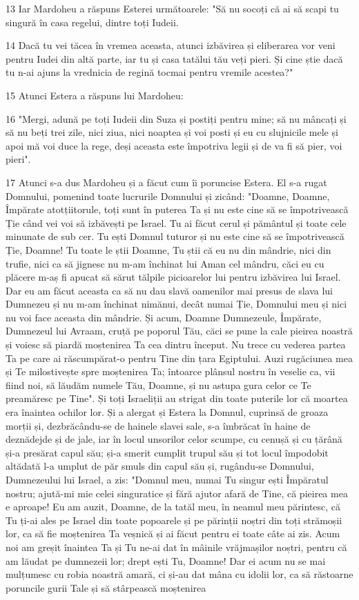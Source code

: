 \par 13 Iar Mardoheu a răspuns Esterei următoarele: "Să nu socoți că ai să scapi tu singură în casa regelui, dintre toți Iudeii.
\par 14 Dacă tu vei tăcea în vremea aceasta, atunci izbăvirea și eliberarea vor veni pentru Iudei din altă parte, iar tu și casa tatălui tău veți pieri. Și cine știe dacă tu n-ai ajuns la vrednicia de regină tocmai pentru vremile acestea?"
\par 15 Atunci Estera a răspuns lui Mardoheu:
\par 16 "Mergi, adună pe toți Iudeii din Suza și postiți pentru mine; să nu mâncați și să nu beți trei zile, nici ziua, nici noaptea și voi posti și eu cu slujnicile mele și apoi mă voi duce la rege, deși aceasta este împotriva legii și de va fi să pier, voi pieri".
\par 17 Atunci s-a dus Mardoheu și a făcut cum îi poruncise Estera. El s-a rugat Domnului, pomenind toate lucrurile Domnului și zicând: "Doamne, Doamne, Împărate atotțiitorule, toți sunt în puterea Ta și nu este cine să se împotrivească Ție când vei voi să izbăvești pe Israel. Tu ai făcut cerul și pământul și toate cele minunate de sub cer. Tu ești Domnul tuturor și nu este cine să se împotrivească Ție, Doamne! Tu toate le știi Doamne, Tu știi că eu nu din mândrie, nici din trufie, nici ca să jignesc nu m-am închinat lui Aman cel mândru, căci eu cu plăcere m-aș fi apucat să sărut tălpile picioarelor lui pentru izbăvirea lui Israel. Dar eu am făcut aceasta ca să nu dau slavă oamenilor mai presus de slava lui Dumnezeu și nu m-am închinat nimănui, decât numai Ție, Domnului meu și nici nu voi face aceasta din mândrie. Și acum, Doamne Dumnezeule, Împărate, Dumnezeul lui Avraam, cruță pe poporul Tău, căci se pune la cale pieirea noastră și voiesc să piardă moștenirea Ta cea dintru început. Nu trece cu vederea partea Ta pe care ai răscumpărat-o pentru Tine din țara Egiptului. Auzi rugăciunea mea și Te milostivește spre moștenirea Ta; întoarce plânsul nostru în veselie ca, vii fiind noi, să lăudăm numele Tău, Doamne, și nu astupa gura celor ce Te preamăresc pe Tine". Și toți Israeliții au strigat din toate puterile lor că moartea era înaintea ochilor lor. Și a alergat și Estera la Domnul, cuprinsă de groaza morții și, dezbrăcându-se de hainele slavei sale, s-a îmbrăcat în haine de deznădejde și de jale, iar în locul unsorilor celor scumpe, cu cenușă și cu țărână și-a presărat capul său; și-a smerit cumplit trupul său și tot locul împodobit altădată l-a umplut de păr smuls din capul său și, rugându-se Domnului, Dumnezeului lui Israel, a zis: "Domnul meu, numai Tu singur ești Împăratul nostru; ajută-mi mie celei singuratice și fără ajutor afară de Tine, că pieirea mea e aproape! Eu am auzit, Doamne, de la tatăl meu, în neamul meu părintesc, că Tu ți-ai ales pe Israel din toate popoarele și pe părinții noștri din toți strămoșii lor, ca să fie moștenirea Ta veșnică și ai făcut pentru ei toate câte ai zis. Acum noi am greșit înaintea Ta și Tu ne-ai dat în mâinile vrăjmașilor noștri, pentru că am lăudat pe dumnezeii lor; drept ești Tu, Doamne! Dar ei acum nu se mai mulțumesc cu robia noastră amară, ci și-au dat mâna cu idolii lor, ca să răstoarne poruncile gurii Tale și să stârpească moștenirea 